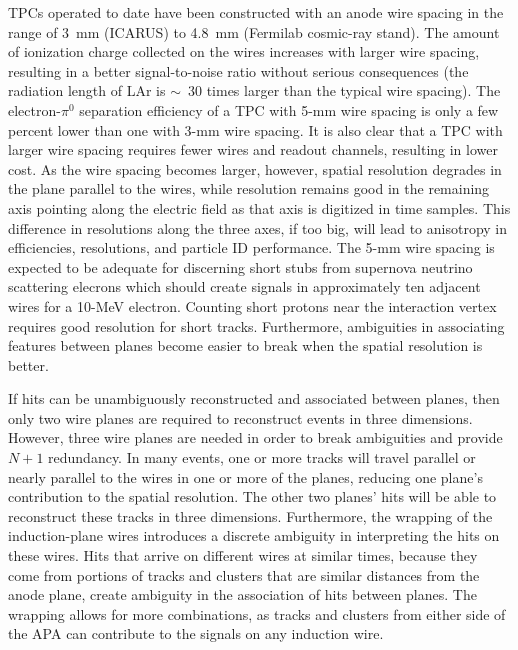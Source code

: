 TPCs operated to date have been constructed with an anode wire spacing
in the range of 3~mm (ICARUS) to 4.8~mm (Fermilab cosmic-ray
stand). The amount of ionization charge collected on the wires
increases with larger wire spacing, resulting in a better
signal-to-noise ratio without serious consequences (the radiation
length of LAr is $\sim$~30 times larger than the typical wire
spacing). The electron-$\pi^0$ separation efficiency of a TPC with
5-mm wire spacing is only a few percent lower than one with 3-mm wire
spacing. It is also clear that a TPC with larger wire spacing requires
fewer wires and readout channels, resulting in lower cost.  As the
wire spacing becomes larger, however, spatial resolution degrades in
the plane parallel to the wires, while resolution remains good in the
remaining axis pointing along the electric field as that axis is
digitized in time samples.  This difference in resolutions along the
three axes, if too big, will lead to anisotropy in efficiencies,
resolutions, and particle ID performance.  The 5-mm wire spacing is
expected to be adequate for discerning short stubs from supernova
neutrino scattering elecrons which should create signals in
approximately ten adjacent wires for a 10-MeV electron.  Counting
short protons near the interaction vertex requires good resolution for
short tracks.  Furthermore, ambiguities in associating features between
planes become easier to break when the spatial resolution is better.%

If hits can be unambiguously reconstructed and associated between
planes, then only two wire planes are required to reconstruct events
in three dimensions.  However, three wire planes are needed in order
to break ambiguities and provide $N+1$ redundancy.  In many events,
one or more tracks will travel parallel or nearly parallel to the
wires in one or more of the planes, reducing one plane's contribution
to the spatial resolution.  The other two planes' hits will be able to
reconstruct these tracks in three dimensions.  Furthermore, the
wrapping of the induction-plane wires introduces a discrete ambiguity
in interpreting the hits on these wires.  Hits that arrive on
different wires at similar times, because they come from portions of
tracks and clusters that are similar distances from the anode plane,
create ambiguity in the association of hits between planes.  The
wrapping allows for more combinations, as tracks and clusters from
either side of the APA can contribute to the signals on any induction
wire.

